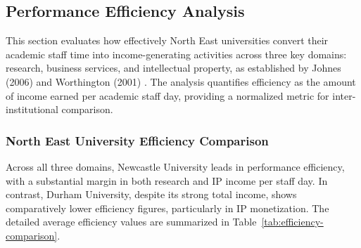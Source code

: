 \documentclass[journal,onecolumn, 10pt,draftclsnofoot]{IEEEtran}
\begin{document}
\subsection{Performance Efficiency Analysis}

This section evaluates how effectively North East universities convert their academic staff time into income-generating activities across three key domains: research, business services, and intellectual property, as established by Johnes (2006) \cite{johnes2006data} and Worthington (2001) \cite{worthington2001empirical}. The analysis quantifies efficiency as the amount of income earned per academic staff day, providing a normalized metric for inter-institutional comparison.

\subsubsection{North East University Efficiency Comparison}

Across all three domains, Newcastle University leads in performance efficiency, with a substantial margin in both research and IP income per staff day. In contrast, Durham University, despite its strong total income, shows comparatively lower efficiency figures, particularly in IP monetization. The detailed average efficiency values are summarized in Table~\ref{tab:efficiency-comparison}.
\vspace{0.25cm}
\begin{table}[h]
\centering
\caption{North East University Efficiency Comparison}
\vspace{0.1cm}
\label{tab:efficiency-comparison}
\end{table}
\end{document}
